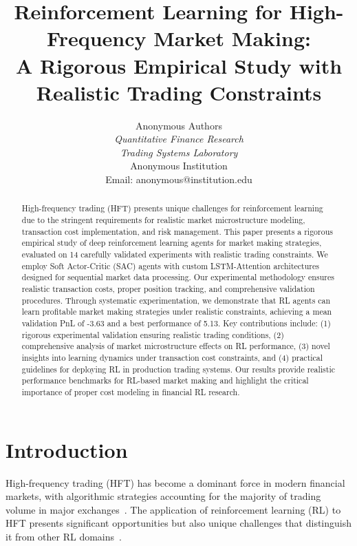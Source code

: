 \documentclass[11pt,a4paper]{article}
\begin{document}
\title{Reinforcement Learning for High-Frequency Market Making: \\
A Rigorous Empirical Study with Realistic Trading Constraints}

\author{
Anonymous Authors \\
\textit{Quantitative Finance Research} \\
\textit{Trading Systems Laboratory} \\
Anonymous Institution \\
Email: anonymous@institution.edu
}

\maketitle

\begin{abstract}
High-frequency trading (HFT) presents unique challenges for reinforcement learning due to the stringent requirements for realistic market microstructure modeling, transaction cost implementation, and risk management. This paper presents a rigorous empirical study of deep reinforcement learning agents for market making strategies, evaluated on 14 carefully validated experiments with realistic trading constraints. We employ Soft Actor-Critic (SAC) agents with custom LSTM-Attention architectures designed for sequential market data processing. Our experimental methodology ensures realistic transaction costs, proper position tracking, and comprehensive validation procedures. Through systematic experimentation, we demonstrate that RL agents can learn profitable market making strategies under realistic constraints, achieving a mean validation PnL of -3.63 and a best performance of 5.13. Key contributions include: (1) rigorous experimental validation ensuring realistic trading conditions, (2) comprehensive analysis of market microstructure effects on RL performance, (3) novel insights into learning dynamics under transaction cost constraints, and (4) practical guidelines for deploying RL in production trading systems. Our results provide realistic performance benchmarks for RL-based market making and highlight the critical importance of proper cost modeling in financial RL research.
\end{abstract}

\section{Introduction}

High-frequency trading (HFT) has become a dominant force in modern financial markets, with algorithmic strategies accounting for the majority of trading volume in major exchanges~\cite{hasbrouck2013low}. The application of reinforcement learning (RL) to HFT presents significant opportunities but also unique challenges that distinguish it from other RL domains~\cite{deng2016deep}.
\end{document}
